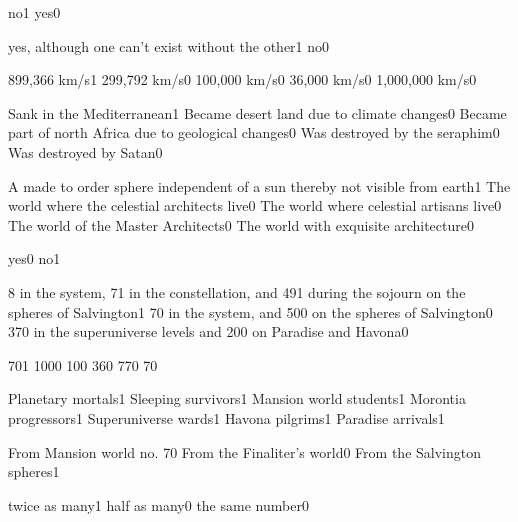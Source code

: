 {no}{1}
{yes}{0}
\qstop

{yes, although one can't exist without the other}{1}
{no}{0}
\qstop

{899,366 km/s}{1}
{299,792 km/s}{0}
{100,000 km/s}{0}
{36,000 km/s}{0}
{1,000,000 km/s}{0}
\qstop

{Sank in the Mediterranean}{1}
{Became desert land due to climate changes}{0}
{Became part of north Africa due to geological changes}{0}
{Was destroyed by the seraphim}{0}
{Was destroyed by Satan}{0}
\qstop

{A made to order sphere independent of a sun thereby not visible from earth}{1}
{The world where the celestial architects live}{0}
{The world where celestial artisans live}{0}
{The world of the Master Architects}{0}
{The world with exquisite architecture}{0}
\qstop

{yes}{0}
{no}{1}
\qstop

{8 in the system, 71 in the constellation, and 491 during the sojourn on the spheres of Salvington}{1}
{70 in the system, and 500 on the spheres of Salvington}{0}
{370 in the superuniverse levels and 200 on Paradise and Havona}{0}
\qstop

{70}{1}
{100}{0}
{10}{0}
{36}{0}
{77}{0}
{7}{0}
\qstop

{Planetary mortals}{1}
{Sleeping survivors}{1}
{Mansion world students}{1}
{Morontia progressors}{1}
{Superuniverse wards}{1}
{Havona pilgrims}{1}
{Paradise arrivals}{1}
\qstop

{From Mansion world no. 7}{0}
{From the Finaliter's world}{0}
{From the Salvington spheres}{1}
\qstop

{twice as many}{1}
{half as many}{0}
{the same number}{0}
\qstop

